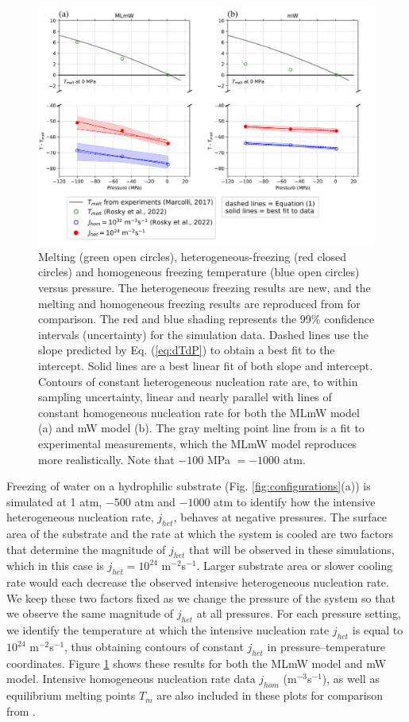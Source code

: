 \documentclass[journal abbreviation, manuscript]{copernicus}
\begin{document}
\begin{figure}[t]
\includegraphics[width=12cm]{figures/homohet_PT_figure.png}
\caption{\label{fig:PT} Melting (green open circles), heterogeneous-freezing (red closed circles) and homogeneous freezing temperature (blue open circles) versus pressure. The heterogeneous freezing results are new, and the melting and homogeneous freezing results are reproduced from \citet{rosky2022} for comparison. The red and blue shading represents the 99\% confidence intervals (uncertainty) for the simulation data. Dashed lines use the slope predicted by Eq. (\ref{eq:dTdP}) to obtain a best fit to the intercept. Solid lines are a best linear fit of both slope and intercept. Contours of constant heterogeneous nucleation rate are, to within sampling uncertainty, linear and nearly parallel with lines of constant homogeneous nucleation rate for both the MLmW model (a) and mW model (b).  The gray melting point line from \citet{marcolli2017} is a fit to experimental measurements, which the MLmW model reproduces more realistically. Note that $-100$ MPa $= -1000$ atm.}
\end{figure}


Freezing of water on a hydrophilic substrate (Fig. \ref{fig:configurations}(a)) is simulated at 1 atm, $-500$ atm and $-1000$ atm to identify how the intensive heterogeneous nucleation rate, $j_{het}$, behaves at negative pressures. The surface area of the substrate and the rate at which the system is cooled are two factors that determine the magnitude of $j_{het}$ that will be observed in these simulations, which in this case is $j_{het} = 10^{24}$ m$^{-2}$s$^{-1}$. Larger substrate area or slower cooling rate would each decrease the observed intensive heterogeneous nucleation rate. We keep these two factors fixed as we change the pressure of the system so that we observe the same magnitude of $j_{het}$ at all pressures. For each pressure setting, we identify the temperature at which the intensive nucleation rate $j_{het}$ is equal to $10^{24}$ m$^{-2}$s$^{-1}$, thus obtaining contours of constant $j_{het}$ in pressure--temperature coordinates. Figure \ref{fig:PT} shows these results for both the MLmW model and mW model. Intensive homogeneous nucleation rate data $j_{hom}$ (m$^{-3}$s$^{-1}$), as well as equilibrium melting points $T_m$ are also included in these plots for comparison from \citet{rosky2022}. 
\end{document}
